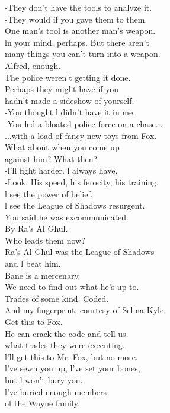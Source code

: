 \documentclass{article}
\begin{document}
\begin{multicols}{3}
-They don't have the tools to analyze it.\\
-They would if you gave them to them.\\
One man's tool is another man's weapon.\\
ln your mind, perhaps. But there aren't\\
many things you can't turn into a weapon.\\
Alfred, enough.\\
The police weren't getting it done.\\
Perhaps they might have if you\\
hadn't made a sideshow of yourself.\\
-You thought l didn't have it in me.\\
-You led a bloated police force on a chase...\\
...with a load of fancy new toys from Fox.\\
What about when you come up\\
against him? What then?\\
-l'll fight harder. l always have.\\
-Look. His speed, his ferocity, his training.\\
l see the power of belief.\\
l see the League of Shadows resurgent.\\
You said he was excommunicated.\\
By Ra's Al Ghul.\\
Who leads them now?\\
Ra's Al Ghul was the League of Shadows\\
and l beat him.\\
Bane is a mercenary.\\
We need to find out what he's up to.\\
Trades of some kind. Coded.\\
And my fingerprint, courtesy of Selina Kyle.\\
Get this to Fox.\\
He can crack the code and tell us\\
what trades they were executing.\\
l'll get this to Mr. Fox, but no more.\\
l've sewn you up, l've set your bones,\\
but l won't bury you.\\
l've buried enough members\\
of the Wayne family.\\

\end{multicols}
\end{document}
